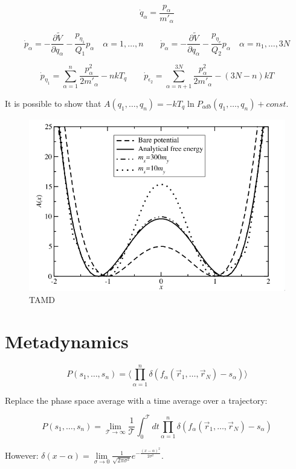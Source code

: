 	$$\dot{q}_\alpha = \frac{p_\alpha}{m'_\alpha}$$

	$$\dot{p}_\alpha = -\frac{\partial\tilde{V}}{\partial q_\alpha} - \frac{p_{\eta_1}}{Q_1}p_\alpha\quad \alpha= 1, \dots, n\qquad\dot{p}_\alpha = -\frac{\partial\tilde{V}}{\partial q_\alpha}-\frac{p_{\eta_e}}{Q_2}p_\alpha\quad \alpha = n_1, \dots, 3N$$

	$$\dot{p}_{\eta_1} = \sum\limits_{\alpha=1}^n\frac{p_\alpha^2}{2m'_\alpha}-nkT_q\qquad \dot{p}_{\epsilon_2} = \sum\limits_{\alpha=n+1}^{3N}\frac{p_\alpha^2}{2m'_\alpha}-(3N-n)kT$$

	It is possible to show that $A(q_1, \dots, q_n) = -kT_q\ln P_{adb}(q_1, \dots, q_n) + const$.

	\begin{figure}[H]
		\includegraphics[width=\textwidth]{tamd}
		\caption{TAMD}
		\label{fig:tamd}
	\end{figure}

\section{Metadynamics}

$$P(s_1, \dots, s_n) = \biggl\langle\prod\limits_{\alpha=1}^n\delta(f_\alpha(\vec{r}_1, \dots, \vec{r}_N)-s_\alpha)\biggr\rangle$$

Replace the phase space average with a time average over a trajectory:

$$P(s_1, \dots, s_n) = \lim\limits_{\mathcal{T}\rightarrow\infty}\frac{1}{\mathcal{T}}\int_0^{\mathcal{T}} dt\prod\limits_{\alpha=1}^n\delta(f_\alpha(\vec{r}_1, \dots, \vec{r}_N)-s_\alpha)$$

However: $\delta(x-\alpha) = \lim\limits_{\sigma\rightarrow 0}\frac{1}{\sqrt{2\pi\sigma^2}}e^{-\frac{(x-\alpha)^2}{2\sigma^2}}$.

